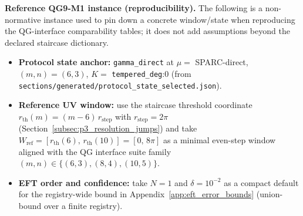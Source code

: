 \noindent\AuditTag \textbf{Reference QG9-M1 instance (reproducibility).} The following is a non-normative instance used to pin down a concrete window/state when reproducing the QG-interface comparability tables; it does not add assumptions beyond the declared staircase dictionary.
\begin{itemize}
\item \textbf{Protocol state anchor:} \texttt{gamma_direct} at $\mu=$ SPARC-direct, $(m,n)=(6,3)$, $K=$ \texttt{tempered_deg}:0 (from \texttt{sections/generated/protocol\_state\_selected.json}).
\item \textbf{Reference UV window:} use the staircase threshold coordinate $r_{\mathrm{th}}(m)=(m-6)\,r_{\mathrm{step}}$ with $r_{\mathrm{step}}=2\pi$ (Section~\ref{subsec:p3_resolution_jumps}) and take $W_{\mathrm{ref}}=[r_{\mathrm{th}}(6),\,r_{\mathrm{th}}(10)]=[0,\,8\pi]$ as a minimal even-step window aligned with the QG interface suite family $(m,n)\in\{(6,3),(8,4),(10,5)\}$.
\item \textbf{EFT order and confidence:} take $N=1$ and $\delta=10^{-2}$ as a compact default for the registry-wide bound in Appendix~\ref{app:eft_error_bounds} (union-bound over a finite registry).
\end{itemize}